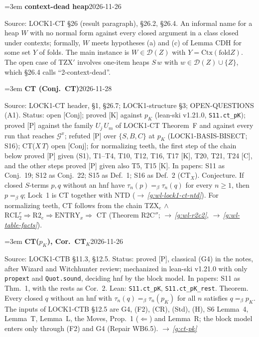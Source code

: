 \documentclass[11pt]{amsart}
\makeatletter
\newcommand{\conv}{=_\beta}
\newcommand{\fold}{\mathrm{fold}}
\newcommand{\Gc}{\mathcal G}
\newcounter{sense}
\newenvironment{entry}[3]{%
  \par\addvspace{\medskipamount}\noindent\phantomsection
  \def\@currentlabel{#2}\label{#1}\setcounter{sense}{0}\raggedright\emergencystretch=3em%
  \textbf{#2}\hfill{\footnotesize\textsf{#3}}\par\nopagebreak\noindent\ignorespaces}%
  {\par}
\newcommand{\src}[1]{\textsf{Source:} #1.\enskip}
\newcommand{\lean}[1]{\textsf{Lean:} #1.\enskip}
\newcommand{\status}[1]{\textsf{Status:} #1.\enskip}
\newcommand{\appears}[1]{\textsf{In papers:} #1.\enskip}
\renewcommand{\see}[1]{$\rightarrow$\,\emph{\ref{#1}}}
\makeatother
\begin{document}
\begin{entry}{g:wl-context-dead}{context-dead heap}{2026-11-26}
\src{LOCK1-CT \S26 (result paragraph), \S26.2, \S26.4}
An informal name for a heap $W$ with no normal form against every closed argument in a class closed
under contexts; formally, $W$ meets hypotheses (a) and (c) of Lemma CDH for some set $Y$ of folds. The
main instance is $W\in\mathcal D(Z)$ with $Y=\mathrm{Ctx}(\fold Z)$. The open case of TZX$'$ involves
one-item heaps $S\,w$ with $w\in\mathcal D(Z)\cup\{Z\}$, which \S26.4 calls ``2-context-dead''.
\end{entry}

\begin{entry}{g:wl-ct}{CT (Conj.~CT)}{2026-11-28}
\src{LOCK1-CT header, \S1, \S26.7; LOCK1-structure \S3; OPEN-QUESTIONS (A1)}
\status{open [Conj]; proved [K] against $p_K$ (lean-ski v1.21.0, \texttt{S11.ct\_pK}); proved [P]
against the family $U_j\,U_m$ of LOCK1-CT Theorem~F and against every run that reaches $\Gc^{x}$;
refuted [P] over $\{S,B,C\}$ at $p_K$ (LOCK1-BASIS-BISECT; S16); CT($X\,T$) open [Conj]; for
normalizing teeth, the first step of the chain below proved [P] given (S1), T1--T4, T10, T12, T16, T17
[K], T20, T21, T24 [C], and the other steps proved [P] given also T5, T15 [K]}
\appears{S11 as Conj.~19; S12 as Conj.~22; S15 as Def.~1; S16 as Def.~2 ($\mathrm{CT}_X$)}
Conjecture. If closed $S$-terms $p,q$ without an hnf have $\tau_n(p)\conv\tau_n(q)$ for every $n\ge1$,
then $p\conv q$; Lock~1 is CT together with NTD (\see{g:wl-lock1-ct-ntd}). For normalizing teeth, CT
follows from the chain TZX$_e$ $\wedge$ $\mathrm{RCL}_2^{r}\Rightarrow\mathrm{R2}_e\Rightarrow
\mathrm{ENTRY}_x\Rightarrow$ CT (Theorem R2C$''$; \see{g:wl-r2c2}, \see{g:wl-table-facts}).
\end{entry}

\begin{entry}{g:wl-ct-pk}{CT($p_K$), Cor.~CT$_K$}{2026-11-26}
\src{LOCK1-CTB \S11.3, \S12.5}
\status{proved [P], classical (G4) in the notes, after Wizard and Witchhunter review; mechanized in
lean-ski v1.21.0 with only \texttt{propext} and \texttt{Quot.sound}, deciding hnf by the block model}
\appears{S11 as Thm.~1, with the rests as Cor.~2}
\lean{\texttt{S11.ct\_pK}, \texttt{S11.ct\_pK\_rest}}
Theorem. Every closed $q$ without an hnf with $\tau_n(q)\conv\tau_n(p_K)$ for all $n$ satisfies
$q\conv p_K$. The inputs of LOCK1-CTB \S12.5 are G4, (F2), (CR), (Std), (H), S6 Lemma~4, Lemma~T,
Lemma~L, the Moves, Prop.~1 ($\Leftarrow$) and Lemma~R; the block model enters only through (F2) and
G4 (Repair WB6.5). \see{g:ct-pk}
\end{entry}
\end{document}
